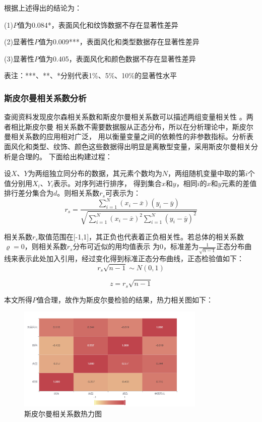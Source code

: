 \documentclass[UTF8]{ctexart}
\begin{document}
	

根据上述得出的结论为：

(1)$P$值为0.084*，表面风化和纹饰数据不存在显著性差异

(2)显著性$P$值为0.009***，表面风化和类型数据存在显著性差异

(3)显著性$P$值为0.405，表面风化和颜色数据不存在显著性差异

表注：***、**、*分别代表1$\%$、5$\%$、10$\%$的显著性水平
\subsubsection{斯皮尔曼相关系数分析}
查阅资料发现皮尔森相关系数和斯皮尔曼相关系数可以描述两组变量相关性\cite{ref2} 。两者相比斯皮尔曼
相关系数不需要数据服从正态分布，所以在分析理论中，斯皮尔曼相关系数的应用相对广泛，
用以衡量变量之间的依赖性的非参数指标。分析表面风化和类型、纹饰、颜色这些数据得出明显是离散型变量，采用斯皮尔曼相关分析是合理的。
下面给出构建过程：

设$X$、$Y$为两组独立同分布的数据，其元素个数均为$N$，两组随机变量中取的第$i$个值分别用$X_i$、$Y_i$表示。对序列进行排序，
得到集合$x$和$y$，相同$i$的$x$和$y$元素的差值排行差分集合为$d$。则相关系数$r_s$可表示为：
\begin{equation}
	r_s=\frac{\sum_{i=1}^N(x_i-\overline{x})(y_i-\overline{y})}{\sqrt{\sum_{i=1}^N(x_i-\overline{x})^2 \sum_{i=1}^N(y_i-\overline{y})^2} }
\end{equation}

相关系数$r_s$取值范围在[-1,1]，其正负也代表着正负相关性。若总体的相关系数$\varrho =0$，则相关系数$r_s$分布可近似的用均值表示
为0，标准差为$\frac{1}{\sqrt{n-1} }$正态分布曲线来表示$此处加入引用$，经过变化得到标准正态分布曲线，正态检验值如下：
\begin{equation}
	r_s \sqrt{n-1} \sim N(0,1)
\end{equation}

\begin{equation}
	z=r_s \sqrt{n-1}
\end{equation}

本文所得$P$值合理，故作为斯皮尔曼检验的结果，热力相关图如下：
\begin{figure}[H]\centering
	\includegraphics[width=0.8\textwidth]{img/斯皮尔曼相关系数热力图.png} %
	\caption{斯皮尔曼相关系数热力图} %
	\label{fig:figure 3} %
\end{figure}
\end{document}
